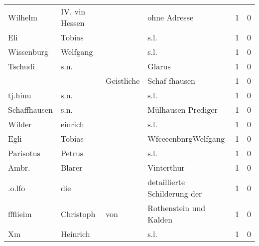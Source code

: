 \begin{tabular}{llllrr}
                  Wilhelm &                     IV. vin Hessen &             &                                ohne Adresse &          1 &         0 \\
                      Eli &                             Tobias &             &                                        s.l. &          1 &         0 \\
               Wissenburg &                           Welfgang &             &                                        s.l. &          1 &         0 \\
                  Tschudi &                               s.n. &             &                                      Glarus &          1 &         0 \\
                          &                                    &  Geistliche &                               Schaf fhausen &          1 &         0 \\
                  tj.hiuu &                               s.n. &             &                                        s.l. &          1 &         0 \\
             Schaffhausen &                               s.n. &             &                          Mülhausen Prediger &          1 &         0 \\
                   Wilder &                            einrich &             &                                        s.l. &          1 &         0 \\
                     Egli &                             Tobias &             &                         WfceeenbnrgWelfgang &          1 &         0 \\
                Parisotus &                             Petrus &             &                                        s.l. &          1 &         0 \\
                    Ambr. &                             Blarer &             &                                  Vinterthur &          1 &         0 \\
                   .o.lfo &                                die &             &                detaillierte Schilderung der &          1 &         0 \\
                 fffiieim &                          Christoph &         von &                      Rothenstein und Kalden &          1 &         0 \\
                       Xm &                           Heinrich &             &                                        s.l. &          1 &         0 \\

\end{tabular}
